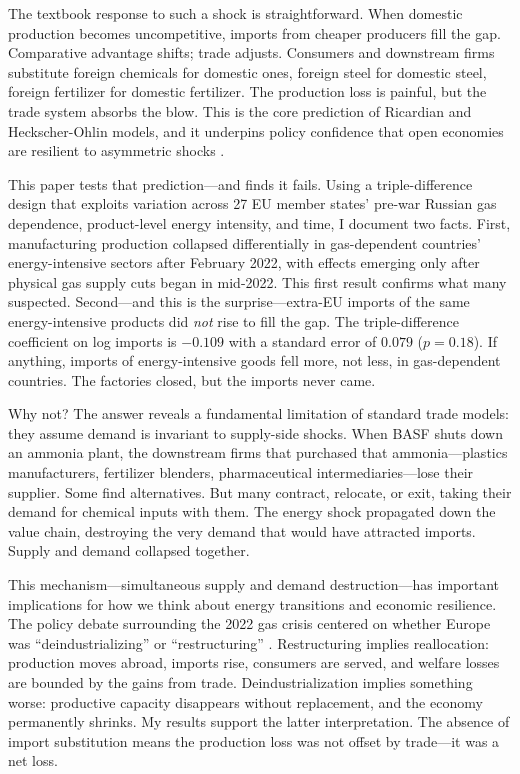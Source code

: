 \documentclass[12pt]{article}
\begin{document}
The textbook response to such a shock is straightforward. When domestic production becomes uncompetitive, imports from cheaper producers fill the gap. Comparative advantage shifts; trade adjusts. Consumers and downstream firms substitute foreign chemicals for domestic ones, foreign steel for domestic steel, foreign fertilizer for domestic fertilizer. The production loss is painful, but the trade system absorbs the blow. This is the core prediction of Ricardian and Heckscher-Ohlin models, and it underpins policy confidence that open economies are resilient to asymmetric shocks \citep{costinot2012, krugman1980}.

This paper tests that prediction---and finds it fails. Using a triple-difference design that exploits variation across 27 EU member states' pre-war Russian gas dependence, product-level energy intensity, and time, I document two facts. First, manufacturing production collapsed differentially in gas-dependent countries' energy-intensive sectors after February 2022, with effects emerging only after physical gas supply cuts began in mid-2022. This first result confirms what many suspected. Second---and this is the surprise---extra-EU imports of the same energy-intensive products did \textit{not} rise to fill the gap. The triple-difference coefficient on log imports is $-0.109$ with a standard error of $0.079$ ($p = 0.18$). If anything, imports of energy-intensive goods fell more, not less, in gas-dependent countries. The factories closed, but the imports never came.

Why not? The answer reveals a fundamental limitation of standard trade models: they assume demand is invariant to supply-side shocks. When BASF shuts down an ammonia plant, the downstream firms that purchased that ammonia---plastics manufacturers, fertilizer blenders, pharmaceutical intermediaries---lose their supplier. Some find alternatives. But many contract, relocate, or exit, taking their demand for chemical inputs with them. The energy shock propagated down the value chain, destroying the very demand that would have attracted imports. Supply and demand collapsed together.

This mechanism---simultaneous supply and demand destruction---has important implications for how we think about energy transitions and economic resilience. The policy debate surrounding the 2022 gas crisis centered on whether Europe was ``deindustrializing'' or ``restructuring'' \citep{pisaniferry2022, bachmann2022}. Restructuring implies reallocation: production moves abroad, imports rise, consumers are served, and welfare losses are bounded by the gains from trade. Deindustrialization implies something worse: productive capacity disappears without replacement, and the economy permanently shrinks. My results support the latter interpretation. The absence of import substitution means the production loss was not offset by trade---it was a net loss.
\end{document}
